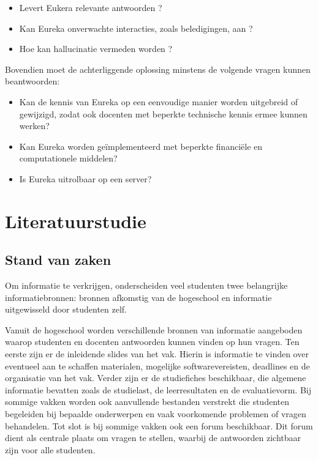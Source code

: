 \begin{itemize}
    \item Levert Eukera relevante antwoorden ? 
    \item Kan Eureka onverwachte interacties, zoals beledigingen, aan ?
    \item Hoe kan hallucinatie vermeden worden ? 
\end{itemize}

Bovendien moet de achterliggende oplossing minstens de volgende vragen kunnen beantwoorden: 

\begin{itemize} 
    \item Kan de kennis van Eureka op een eenvoudige manier worden uitgebreid of gewijzigd, zodat ook docenten met beperkte technische kennis ermee kunnen werken?
    \item Kan Eureka worden geïmplementeerd met beperkte financiële en computationele middelen?
    \item Is Eureka uitrolbaar op een server?
\end{itemize}


\section{Literatuurstudie}%
\label{sec:literatuurstudie}

\subsection{Stand van zaken}

Om informatie te verkrijgen, onderscheiden veel studenten twee belangrijke informatiebronnen: bronnen afkomstig van de hogeschool en informatie uitgewisseld door studenten zelf.

Vanuit de hogeschool worden verschillende bro\-nnen van informatie aangeboden waarop studenten en docenten antwoorden kunnen vinden op hun vragen. Ten eerste zijn er de inleidende slides van het vak. Hierin is informatie te vinden over eventueel aan te schaffen materialen, mogelijke softwarevereisten, deadlines en de organisatie van het vak. Verder zijn er de studiefiches beschikbaar, die algemene informatie bevatten zoals de studielast, de leerresultaten en de evaluatievorm. Bij sommige vakken worden ook aanvullende bestanden verstrekt die studenten begeleiden bij bepaalde onderwerpen en vaak voorkomende problemen of vragen behandelen. Tot slot is bij sommige vakken ook een forum beschikbaar. Dit forum dient als centrale plaats om vragen te stellen, waarbij de antwoorden zichtbaar zijn voor alle studenten.


